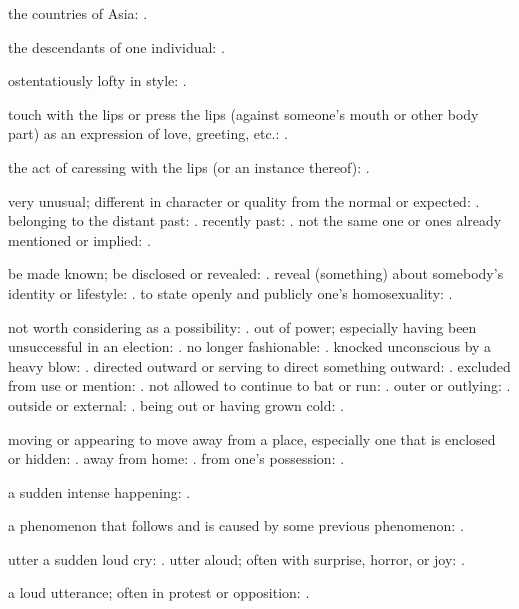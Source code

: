   the countries of Asia: .

  the descendants of one individual: .

  ostentatiously lofty in style: .

  touch with the lips or press the lips (against someone's mouth or other body part) as an expression of love, greeting, etc.: .

  the act of caressing with the lips (or an instance thereof): .

  very unusual; different in character or quality from the normal or expected: . belonging to the distant past: . recently past: . not the same one or ones already mentioned or implied: .

  be made known; be disclosed or revealed: . reveal (something) about somebody's identity or lifestyle: . to state openly and publicly one's homosexuality: .

  not worth considering as a possibility: . out of power; especially having been unsuccessful in an election: . no longer fashionable: . knocked unconscious by a heavy blow: . directed outward or serving to direct something outward: . excluded from use or mention: . not allowed to continue to bat or run: . outer or outlying: . outside or external: . being out or having grown cold: .

  moving or appearing to move away from a place, especially one that is enclosed or hidden: . away from home: . from one's possession: .

  a sudden intense happening: .

  a phenomenon that follows and is caused by some previous phenomenon: .

  utter a sudden loud cry: . utter aloud; often with surprise, horror, or joy: .

  a loud utterance; often in protest or opposition: .

